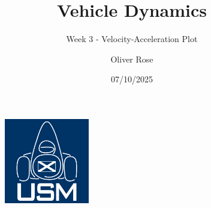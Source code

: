 \documentclass{beamer}
\title{Vehicle Dynamics}
\subtitle{Week 3 - Velocity-Acceleration Plot}
\author{Oliver Rose}
\institute{University of Strathclyde Motorsport}
\date{07/10/2025}
\begin{document}
\begin{frame}
    \maketitle
\end{frame}




\begin{frame}[focus]
    \begin{figure}
        \includegraphics[width=0.33\textwidth]{../../res/usm-logo.png}
    \end{figure}
\end{frame}
\end{document}
